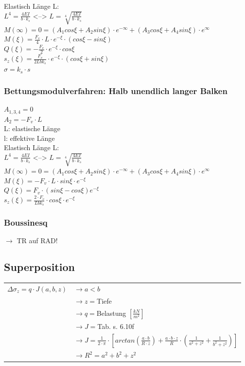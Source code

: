 \begin{multicols}{2}
	Elastisch Länge L:\\
	$L^4 = \frac{4EI}{b\cdot k_s}$
	<-->
	$L = \sqrt[4]{\frac{4EI}{b\cdot k_s}}$\\
	$M(\infty)=0=(A_1cos\xi + A_2sin\xi)\cdot e^{-\infty}+(A_3cos\xi + A_4sin\xi) \cdot e^\infty$\\
	$M(\xi)=\frac{F_v}{4}\cdot L\cdot e^{-\xi}\cdot(cos\xi - sin\xi)$\\
	$Q(\xi)=-\frac{F_v}{2}\cdot e^{-\xi}\cdot cos\xi$\\
	$s_z(\xi)=\frac{F_v}{2Lbk_s}\cdot e^{-\xi}\cdot(cos\xi+sin\xi)$ \\
	$ \sigma = k_s \cdot s $
	\subsubsection{Bettungsmodulverfahren: Halb unendlich langer Balken}
	$A_{1,3,4} = 0$ \\
	$A_2=-F_v\cdot L$\\
	L: elastische Länge\\
	l: effektive Länge\\
	
	Elastisch Länge L:\\
	$L^4 = \frac{4EI}{b\cdot k_s}$
	<-->
	$L = \sqrt[4]{\frac{4EI}{b\cdot k_s}}$\\
	$M(\infty)=0=(A_1cos\xi + A_2sin\xi)\cdot e^{-\infty}+(A_3cos\xi + A_4sin\xi) \cdot e^\infty$\\
	$M(\xi)=-F_v\cdot L\cdot sin\xi\cdot e^{-\xi} $\\
	$Q(\xi)=F_v\cdot (sin\xi - cos\xi) e^{-\xi}$\\
	$s_z(\xi)=\frac{2\cdot F_v}{Lbk_s}\cdot cos\xi\cdot e^{-\xi}$


	\subsubsection{Boussinesq}
	
	\begin{minipage}[t]{0.5\linewidth}
		$\rightarrow$ TR auf RAD!
		\subsection{Superposition}
		\begin{tabular}{ll}
			$\Delta \sigma_z=q \cdot J(a,b,z)$	& $\rightarrow a<b$ \\
			& $\rightarrow z=$Tiefe \\
			& $\rightarrow q=$Belastung $\left[\frac{kN}{m^2}\right]$ \\
			& $\rightarrow J=$Tab. s. 6.10f \\
			& $\rightarrow J=\frac{1}{2\cdot \pi} \cdot \left[arctan(\frac{a \cdot b}{R \cdot z}) + \frac{a \cdot b \cdot z}{R} \cdot  \left(\frac{1}{a^2 + z^2} + \frac{1}{b^2 + z^2}\right) \right]$ \\
			& $\rightarrow R^2=a^2 + b^2 + z^2$ \\	
		\end{tabular}
		

\end{minipage}
\end{multicols}
